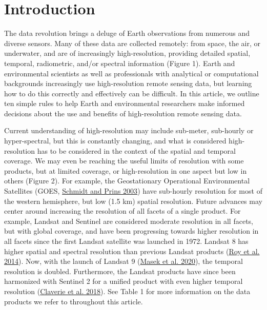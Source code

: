 \documentclass[
  12pt,
]{article}
\begin{document}
\hypertarget{introduction}{%
\section{Introduction}\label{introduction}}

The data revolution brings a deluge of Earth observations from numerous
and diverse sensors. Many of these data are collected remotely: from
space, the air, or underwater, and are of increasingly high-resolution,
providing detailed spatial, temporal, radiometric, and/or spectral
information (Figure 1). Earth and environmental scientists as well as
professionals with analytical or computational backgrounds increasingly
use high-resolution remote sensing data, but learning how to do this
correctly and effectively can be difficult. In this article, we outline
ten simple rules to help Earth and environmental researchers make
informed decisions about the use and benefits of high-resolution remote
sensing data.

Current understanding of high-resolution may include sub-meter,
sub-hourly or hyper-spectral, but this is constantly changing, and what
is considered high-resolution has to be considered in the context of the
spatial and temporal coverage. We may even be reaching the useful limits
of resolution with some products, but at limited coverage, or
high-resolution in one aspect but low in others (Figure 2). For example,
the Geostationary Operational Environmental Satellites (GOES,
\protect\hyperlink{ref-schmidt_goes_2003}{Schmidt and Prins 2003}) have
sub-hourly resolution for most of the western hemisphere, but low (1.5
km) spatial resolution. Future advances may center around increasing the
resolution of all facets of a single product. For example, Landsat and
Sentinel are considered moderate resolution in all facets, but with
global coverage, and have been progressing towards higher resolution in
all facets since the first Landsat satellite was launched in 1972.
Landsat 8 has higher spatial and spectral resolution than previous
Landsat products (\protect\hyperlink{ref-roy2014landsat}{Roy et al.
2014}). Now, with the launch of Landsat 9
(\protect\hyperlink{ref-masek2020landsat}{Masek et al. 2020}), the
temporal resolution is doubled. Furthermore, the Landsat products have
since been harmonized with Sentinel 2 for a unified product with even
higher temporal resolution
(\protect\hyperlink{ref-claverie2018harmonized}{Claverie et al. 2018}).
See Table 1 for more information on the data products we refer to
throughout this article.
\end{document}
